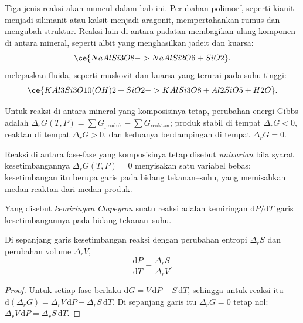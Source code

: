 Tiga jenis reaksi akan muncul dalam bab ini. Perubahan polimorf, seperti kianit menjadi
silimanit atau kalsit menjadi aragonit, mempertahankan rumus dan mengubah struktur.
Reaksi lain di antara padatan membagikan ulang komponen di antara mineral, seperti
albit yang menghasilkan jadeit dan kuarsa:
\[
\ce{NaAlSi3O8 -> NaAlSi2O6 + SiO2}.
\]
 melepaskan fluida, seperti muskovit dan kuarsa yang terurai
pada suhu tinggi:
\[
\ce{KAl3Si3O10(OH)2 + SiO2 -> KAlSi3O8 + Al2SiO5 + H2O}.
\]

Untuk reaksi di antara mineral yang komposisinya tetap, perubahan energi Gibbs adalah
$\Delta_r G(T, P) = \sum G_{\text{produk}} - \sum G_{\text{reaktan}}$; produk
stabil di tempat $\Delta_r G < 0$, reaktan di tempat $\Delta_r G > 0$, dan keduanya
berdampingan di tempat $\Delta_r G = 0$.

\begin{definition}\label{def:b2:metamorphic-facies:univariant}
Reaksi di antara fase-fase yang komposisinya tetap disebut \emph{univarian}
bila syarat kesetimbangannya $\Delta_r G(T, P) = 0$ menyisakan satu variabel
bebas: kesetimbangan itu berupa garis pada bidang tekanan--suhu, yang memisahkan
medan reaktan dari medan produk.
\end{definition}

\begin{definition}\label{def:b2:metamorphic-facies:clapeyron}
Yang disebut \emph{kemiringan Clapeyron} suatu reaksi adalah kemiringan
$\mathrm dP/\mathrm dT$ garis kesetimbangannya pada bidang tekanan--suhu.
\end{definition}

\begin{proposition}\label{prop:b2:metamorphic-facies:clapeyron}
Di sepanjang garis kesetimbangan reaksi dengan perubahan entropi $\Delta_r S$ dan perubahan
volume $\Delta_r V$,
\[
\frac{\mathrm dP}{\mathrm dT} = \frac{\Delta_r S}{\Delta_r V}.
\]
\end{proposition}

\begin{proof}
Untuk setiap fase berlaku $\mathrm dG = V\,\mathrm dP - S\,\mathrm dT$, sehingga untuk reaksi itu
$\mathrm d(\Delta_r G) = \Delta_r V\,\mathrm dP - \Delta_r S\,\mathrm dT$. Di sepanjang garis itu
$\Delta_r G = 0$ tetap nol: $\Delta_r V\,\mathrm dP = \Delta_r S\,\mathrm dT$.
\end{proof}

